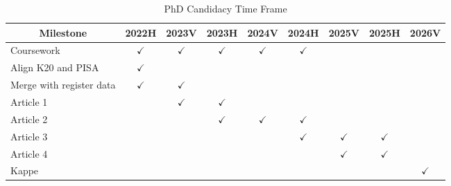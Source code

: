 \documentclass[
    a4paper,                %
    11pt,                   %
    stu,                    %
    donotrepeattitle,       %
    floatsintext,           %
    biblatex,               %
    colorlinks=true,        %
    linkcolor=red,          %
    anchorcolor=black,      %
    citecolor=blue,         %
    urlcolor=blue,          %
    bookmarks=true,         %
    bookmarksopen=false,    %
    bookmarksnumbered=true, %
    dvipsnames              %
]{apa7}
\begin{document}
\begin{table}[htbp]
    \begin{threeparttable}
    \caption{PhD Candidacy Time Frame}
    \label{tab:timeframe}
    \begin{tabular}{lcccccccc}
        \toprule
        \multicolumn{1}{c}{Milestone} & 2022H & 2023V & 2023H & 2024V & 2024H & 2025V & 2025H & 2026V \\
        \midrule
        Coursework & $\checkmark$     & $\checkmark$     & $\checkmark$     & $\checkmark$      & $\checkmark$      &       &       &  \\
        Align K20 and PISA & $\checkmark$     &       &       &       &       &       &       &  \\
        Merge with register data & $\checkmark$     & $\checkmark$     &       &       &       &       &       &  \\
        Article 1 &       & $\checkmark$     & $\checkmark$     &       &       &       &       &  \\
        Article 2 &       &       & $\checkmark$     & $\checkmark$     & $\checkmark$     &       &       &  \\
        Article 3 &       &       &       &       & $\checkmark$     & $\checkmark$     & $\checkmark$     &  \\
        Article 4 &       &       &       &       &       & $\checkmark$     & $\checkmark$     &  \\
        Kappe &       &       &       &       &       &       &       & $\checkmark$ \\
        \bottomrule
        \end{tabular}
    \end{threeparttable}
\end{table}

\printbibliography
\end{document}

